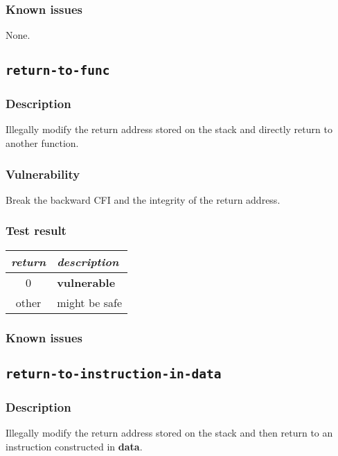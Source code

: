\documentclass[a4paper]{book}
\begin{document}
\subsubsection{Known issues}

None.

\newpage
\subsection{\texttt{return-to-func}}\label{test-return-to-func}

\subsubsection{Description}
Illegally modify the return address stored on the stack and directly return to another function.

\subsubsection{Vulnerability}
Break the backward CFI and the integrity of the return address.

\subsubsection{Test result}
\begin{tabular}{cl}
  \toprule
  \emph{return}  & \emph{description} \\
  \midrule
  0              & \textbf{vulnerable} \\
  other          & might be safe \\
  \bottomrule
\end{tabular}
  
\subsubsection{Known issues}

\newpage
\subsection{\texttt{return-to-instruction-in-data}}\label{test-return-to-instruction-in-data}

\subsubsection{Description}
Illegally modify the return address stored on the stack and then return to  an instruction constructed in \textbf{data}.
\end{document}

